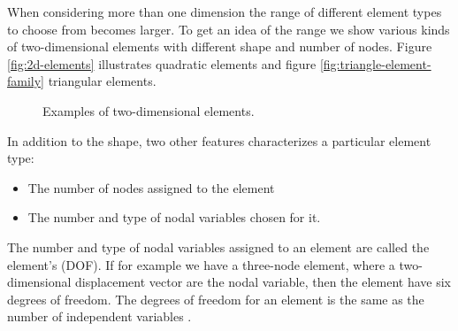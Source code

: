 When considering more than one dimension the range of different
element types to choose from becomes larger.
To get an idea of the range we show various kinds of
two-dimensional elements with different shape and number of
nodes. Figure \vref{fig:2d-elements}
illustrates quadratic elements and figure
\vref{fig:triangle-element-family} triangular elements.

\begin{figure}
  \centering
  \hspace{10mm}
  \caption{Examples of two-dimensional elements.}
  \label{fig:2d-elements}
\end{figure}

In addition to the shape, two other features characterizes a
particular element type:

\begin{itemize}
\item The number of nodes assigned to the element
\item The number and type of nodal variables chosen for it.
\end{itemize}

The number and type of nodal variables assigned to an element are
called the element's  (DOF). If for example we have a
three-node element, where a two-dimensional displacement vector are
the nodal variable, then the element have six degrees of freedom. The
degrees of freedom for an element is the same as the number of
independent variables .

